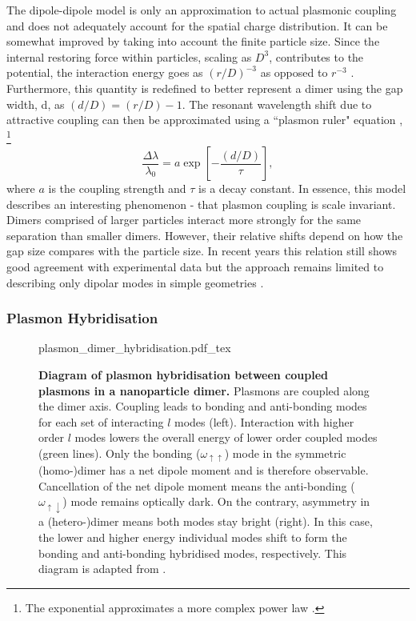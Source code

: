\documentclass{article}
\begin{document}
The dipole-dipole model is only an approximation to actual plasmonic coupling and does not adequately account for the spatial charge distribution. It can be somewhat improved by taking into account the finite particle size. Since the internal restoring force within particles, scaling as $D^3$, contributes to the potential, the interaction energy goes as $(r/D)^{-3}$ as opposed to $r^{-3}$ \cite{jain2007}. Furthermore, this quantity is redefined to better represent a dimer using the gap width, \gls{d}, as $(d/D) = (r/D)-1$. The resonant wavelength shift due to attractive coupling can then be approximated using a ``plasmon ruler" equation \cite{jain2007, ben2011},%
\footnote{The exponential approximates a more complex power law \cite{kadkhodazadeh2014scaling}.}
\begin{equation}
	\frac{\Delta\lambda}{\lambda_0} = a\exp{\left[-\frac{(d/D)}{\tau}\right]},
	\label{eq:plasmon_ruler}
\end{equation}
where $a$ is the coupling strength and $\tau$ is a decay constant. In essence, this model describes an interesting phenomenon - that plasmon coupling is scale invariant. Dimers comprised of larger particles interact more strongly for the same separation than smaller dimers. However, their relative shifts depend on how the gap size compares with the particle size. In recent years this relation still shows good agreement with experimental data but the approach remains limited to describing only dipolar modes in simple geometries \cite{muskens2007}.

\FloatBarrier
\subsubsection{Plasmon Hybridisation}

\begin{figure}[bt]
\centering
\fontsize{10pt}{1em}\selectfont
\def\svgwidth{0.98\textwidth}
{plasmon_dimer_hybridisation.pdf_tex}
\caption[Diagram of plasmon hybridisation between coupled plasmons in a nanoparticle dimer]{\textbf{Diagram of plasmon hybridisation between coupled plasmons in a nanoparticle dimer.} Plasmons are coupled along the dimer axis. Coupling leads to bonding and anti-bonding modes for each set of interacting $l$ modes (left). Interaction with higher order $l$ modes lowers the overall energy of lower order coupled modes (green lines). Only the bonding ($\omega_{\uparrow\uparrow}$) mode in the symmetric (homo-)dimer has a net dipole moment and is therefore observable. Cancellation of the net dipole moment means the anti-bonding ($\omega_{\uparrow\downarrow}$) mode remains optically dark. On the contrary, asymmetry in a (hetero-)dimer means both modes stay bright (right). In this case, the lower and higher energy individual modes shift to form the bonding and anti-bonding hybridised modes, respectively. This diagram is adapted from \cite{nordlander2004}.}
\label{fig:plasmon_hybridisation}
\end{figure}
\end{document}
